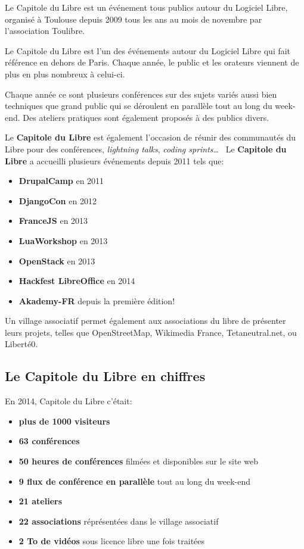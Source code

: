 
Le Capitole du Libre est un événement tous publics autour du Logiciel Libre,
 organisé à Toulouse depuis 2009 tous les ans au mois de novembre
 par l'association Toulibre.

Le Capitole du Libre est l'un des événements autour du Logiciel Libre
 qui fait référence en dehors de Paris.
 Chaque année, le public et les orateurs viennent de plus en plus nombreux
 à celui-ci.

Chaque année ce sont plusieurs conférences sur des sujets variés
 aussi bien techniques que grand public qui se déroulent en parallèle
 tout au long du week-end.
 Des ateliers pratiques sont également proposés à des publics divers.

\Separateur

Le \textbf{Capitole du Libre} est également l'occasion de réunir des 
communautés du Libre pour des conférences, \textit{lightning talks}, 
\textit{coding sprints}\dots ~ Le \textbf{Capitole du Libre} a 
accueilli plusieurs événements depuis 2011 tels que:
\begin{itemize}[label=$\bullet$]
\item \textbf{DrupalCamp} en 2011
\item \textbf{DjangoCon} en 2012
\item \textbf{FranceJS} en 2013
\item \textbf{LuaWorkshop} en 2013
\item \textbf{OpenStack} en 2013
\item \textbf{Hackfest LibreOffice}  en 2014
\item \textbf{Akademy-FR} depuis la première édition!
\end{itemize}

\Separateur

Un village associatif permet également aux associations du libre de
 présenter leurs projets, telles que OpenStreetMap, Wikimedia France, 
Tetaneutral.net, ou Liberté0.

\subsection{Le Capitole du Libre en chiffres}

En 2014, Capitole du Libre c'était:
\begin{itemize}[label=$\bullet$]
\item \textbf{plus de 1000 visiteurs}
\item \textbf{63 conférences}
\item \textbf{50 heures de conférences} filmées et disponibles sur le site web
\item \textbf{9 flux de conférence en parallèle} tout au long du week-end
\item \textbf{21 ateliers}
\item \textbf{22 associations} réprésentées dans le village associatif
\item \textbf{2 To de vidéos} sous licence libre une fois traitées
\end{itemize}

